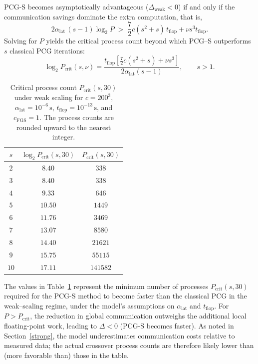 \documentclass[pdflatex,sn-mathphys-num]{sn-jnl}%
\begin{document}
PCG-S becomes asymptotically advantageous
(\(\Delta_{\mathrm{weak}} < 0\))
if and only if the communication savings dominate the extra computation, that is,
\[
2\alpha_{\mathrm{lat}} \,(s - 1) \log_2 P
\;>\;
\frac{7}{2}c(s^2+s)\,t_{\mathrm{flop}}
+ \nu s^3t_{\mathrm{flop}}.
\]
Solving for $P$ yields the critical process count beyond which
PCG--S outperforms $s$ classical PCG iterations:
\begin{equation}
\label{eq:Pcrit}
\log_2 P_{\mathrm{crit}}(s,\nu)
=
\frac{
t_{\mathrm{flop}}
\left[
\frac{7}{2}c(s^2+s)
+
\nu s^3
\right]
}{
2\alpha_{\mathrm{lat}}(s-1)
},
\qquad s>1.
\end{equation}
%
\begin{table}[htbp]
\centering
\begin{tabular}{@{}ccc@{}}
\toprule
$s$
&
$\log_2 P_{\mathrm{crit}}(s,30)$
&
$P_{\mathrm{crit}}(s,30)$
\\
\midrule
$2$  & $8.40$  & $338$    \\
$3$  & $8.40$  & $338$    \\
$4$  & $9.33$  & $646$    \\
$5$  & $10.50$ & $1449$   \\
$6$  & $11.76$ & $3469$   \\
$7$  & $13.07$ & $8580$   \\
$8$  & $14.40$ & $21621$  \\
$9$  & $15.75$ & $55115$  \\
$10$ & $17.11$ & $141582$ \\
\bottomrule
\end{tabular}
\caption{Critical process count $P_{\mathrm{crit}}(s,30)$ under weak
scaling for $c=200^3$, $\alpha_{\mathrm{lat}}=10^{-6}\,\mathrm{s}$,
$t_{\mathrm{flop}}=10^{-13}\,\mathrm{s}$, and
$c_{\mathrm{FGS}}=1$. The process counts are rounded upward to the
nearest integer.}
\label{tab:pcrit}
\end{table}

The values in Table~\ref{tab:pcrit} represent the minimum number of processes
$P_{\mathrm{crit}}(s,30)$ required for the PCG-S method
to become faster than the classical PCG in the weak--scaling regime,
under the model's assumptions on $\alpha_{\mathrm{lat}}$ and $t_{\mathrm{flop}}$.
For $P > P_{\mathrm{crit}}$, the reduction in global communication
outweighs the additional local floating-point work,
leading to $\Delta < 0$ (PCG-S becomes faster).
As noted in Section~\ref{strong}, the model underestimates communication costs
relative to measured data; the actual crossover process counts are therefore
likely lower than (more favorable than) those in the table.
\end{document}
